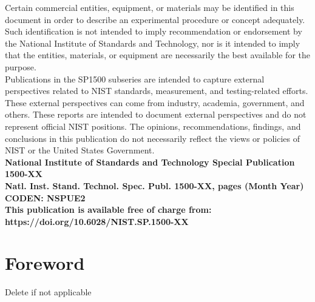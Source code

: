 \documentclass[12pt]{article}
\newcommand{\pubnumber}{1500-XX}
\newcommand{\DOI}{https://doi.org/10.6028/NIST.SP.1500-XX}
\newcommand{\monthyear}{Month Year}
\begin{document}
\begin{titlepage}
\begin{flushright}
\footnotesize  Certain commercial entities, equipment, or materials may be identified in this document in order to describe an experimental procedure or concept adequately. Such identification is not intended to imply recommendation or endorsement by the National Institute of Standards and Technology, nor is it intended to imply that the entities, materials, or equipment are necessarily the best available for the purpose.\\ 
\vspace{12pt}
\vspace{12pt}
\footnotesize Publications in the SP1500 subseries are intended to capture external perspectives related to NIST standards, measurement, and testing-related efforts. These external perspectives can come from industry, academia, government, and others. These reports are intended to document external perspectives and do not represent official NIST positions.
The opinions, recommendations, findings, and conclusions in this publication
do not necessarily reflect the views or policies of NIST or the United States Government.\\
\vfill
\normalsize \textbf{National Institute of Standards and Technology Special Publication \pubnumber\\ 
Natl. Inst. Stand. Technol. Spec. Publ. \pubnumber, \pageref{LastPage} pages (\monthyear)} \\
\textbf{CODEN: NSPUE2}\\
\vspace{12pt}
\textbf{This publication is available free of charge from: \DOI}
\vfill
\end{flushright}
\end{titlepage}
\section*{Foreword}
\normalsize Delete if not applicable\\
\end{document}
